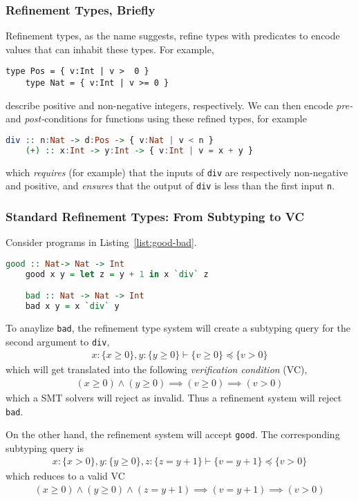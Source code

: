 \documentclass[a4paper,UKenglish]{lipics-v2016}
\begin{document}
\subsubsection{Refinement Types, Briefly}
Refinement types, as the name suggests, refine types with predicates to encode
values that can inhabit these types.  For example,
\begin{lstlisting}[abovecaptionskip=-\medskipamount]
    type Pos = { v:Int | v >  0 }
    type Nat = { v:Int | v >= 0 }
\end{lstlisting}
describe positive and non-negative integers, respectively.  We can then encode
\emph{pre-} and \emph{post-}conditions for functions using these refined types,
for example
\begin{lstlisting}[language=haskell,abovecaptionskip=-\medskipamount]
    div :: n:Nat -> d:Pos -> { v:Nat | v < n } 
    (+) :: x:Int -> y:Int -> { v:Int | v = x + y }
\end{lstlisting}
which \emph{requires} (for example) that the inputs of \texttt{div} are
respectively non-negative and positive, and \emph{ensures} that the output of
\texttt{div} is less than the first input \texttt{n}.

\subsubsection{Standard Refinement Types: From Subtyping to VC}
Consider programs in Listing~\ref{list:good-bad}.
\begin{lstlisting}[caption={Simple Example},float,captionpos=t,label={list:good-bad},language=haskell,abovecaptionskip=-\medskipamount]
    good :: Nat-> Nat -> Int
    good x y = let z = y + 1 in x `div` z

    bad :: Nat -> Nat -> Int
    bad x y = x `div` y
\end{lstlisting}
To anaylize \texttt{bad}, the refinement type system will create a subtyping
query for the second argument to \texttt{div},
\begin{align*}
    x:\{x\geq0\}, y:\{y\geq0\}\vdash\{v\geq0\}\preceq\{v>0\}
\end{align*}
which will get translated into the following \emph{verification condition}
(VC),
\begin{align*}
    (x\geq0)\wedge(y\geq0)\implies(v\geq0)\implies(v>0)
\end{align*}
which a SMT solvers will reject as invalid.  Thus a refinement system will
reject \texttt{bad}.

On the other hand, the refinement system will accept \texttt{good}.  The
corresponding subtyping query is
\begin{align*}
    x:\{x>0\}, y:\{y\geq0\},z:\{z=y+1\}\vdash\{v=y+1\}\preceq\{v>0\}
\end{align*}
which reduces to a valid VC
\begin{align*}
    (x\geq0)\wedge(y\geq0)\wedge(z=y+1)\implies(v=y+1)\implies(v>0)
\end{align*}
\end{document}

